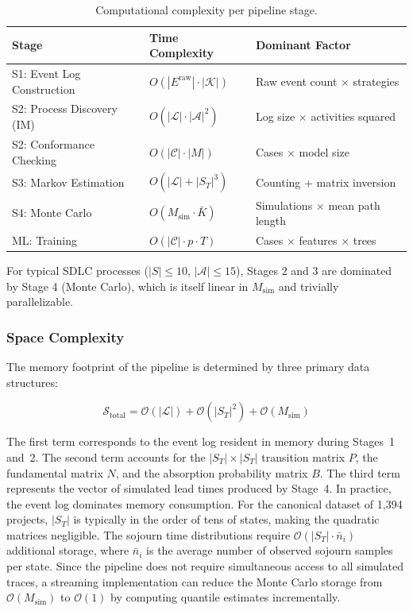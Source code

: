 \begin{table}[htbp]
\centering
\caption{Computational complexity per pipeline stage.}
\label{tab:complexity}
\begin{tabular}{lll}
\toprule
\textbf{Stage} & \textbf{Time Complexity} & \textbf{Dominant Factor} \\
\midrule
S1: Event Log Construction & $O(|E^{\text{raw}}| \cdot |\mathcal{K}|)$ & Raw event count $\times$ strategies \\
S2: Process Discovery (IM) & $O(|\mathcal{L}| \cdot |\mathcal{A}|^2)$ & Log size $\times$ activities squared \\
S2: Conformance Checking & $O(|\mathcal{C}| \cdot |M|)$ & Cases $\times$ model size \\
S3: Markov Estimation & $O(|\mathcal{L}| + |S_T|^3)$ & Counting + matrix inversion \\
S4: Monte Carlo & $O(M_{\text{sim}} \cdot \bar{K})$ & Simulations $\times$ mean path length \\
ML: Training & $O(|\mathcal{C}| \cdot p \cdot T)$ & Cases $\times$ features $\times$ trees \\
\bottomrule
\end{tabular}
\end{table}

For typical SDLC processes ($|S| \leq 10$, $|\mathcal{A}| \leq 15$),
Stages 2 and 3 are dominated by Stage 4 (Monte Carlo), which is itself
linear in $M_{\text{sim}}$ and trivially parallelizable.

\subsubsection{Space Complexity}

The memory footprint of the pipeline is determined by three primary data
structures:

\begin{equation}
\label{eq:space-complexity}
\mathcal{S}_{\text{total}} = \mathcal{O}(|\mathcal{L}|) +
\mathcal{O}(|S_T|^2) + \mathcal{O}(M_{\text{sim}})
\end{equation}

\noindent The first term corresponds to the event log resident in memory
during Stages~1 and~2. The second term accounts for the $|S_T| \times
|S_T|$ transition matrix $P$, the fundamental matrix $N$, and the
absorption probability matrix $B$. The third term represents the vector
of simulated lead times produced by Stage~4. In practice, the event log
dominates memory consumption. For the canonical dataset of 1{,}394
projects, $|S_T|$ is typically in the order of tens of states, making the
quadratic matrices negligible. The sojourn time distributions require
$\mathcal{O}(|S_T| \cdot \bar{n}_i)$ additional storage, where
$\bar{n}_i$ is the average number of observed sojourn samples per state.
Since the pipeline does not require simultaneous access to all simulated
traces, a streaming implementation can reduce the Monte Carlo storage
from $\mathcal{O}(M_{\text{sim}})$ to $\mathcal{O}(1)$ by computing
quantile estimates incrementally.

